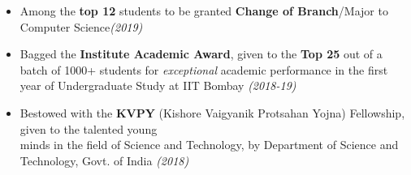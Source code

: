 \documentclass{article}
\newcommand{\xfilll}[2][1ex]{
\dimen0=#2\advance\dimen0 by #1
\leaders\hrule height \dimen0 depth -#1\hfill}
\begin{document}
\begin{itemize}[itemsep = -0.75 mm, leftmargin=*]
\item Among the {\bf top 12} students to be granted {\bf Change of Branch}/Major to Computer Science\hfill{\sl \small(2019)}
\item  Bagged the {\bf Institute Academic Award}, given to the \textbf{Top 25} out of a batch of 1000+ students for {\it exceptional} academic performance in the first year of Undergraduate Study at IIT Bombay
 \hfill{\sl \small (2018-19)}
\item  Bestowed with the {\bf KVPY} (Kishore Vaigyanik Protsahan Yojna) Fellowship, given to the talented young \\minds in the field of Science and Technology, by Department of Science and Technology, Govt. of India \hfill{\sl \small (2018)}

\end{itemize}





\vspace{-22pt}
\end{document}
